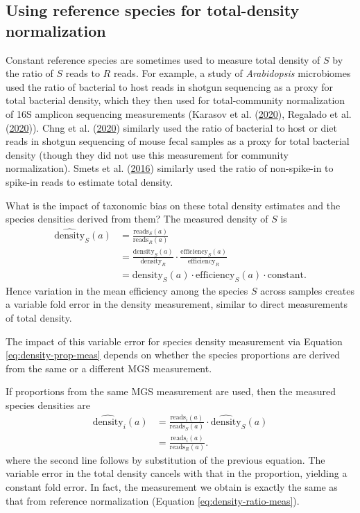 \documentclass[
]{article}
\begin{document}
\hypertarget{total-density-ref}{%
\subsection{Using reference species for total-density normalization}\label{total-density-ref}}

Constant reference species are sometimes used to measure total density of \(S\) by the ratio of \(S\) reads to \(R\) reads.
For example, a study of \emph{Arabidopsis} microbiomes used the ratio of bacterial to host reads in shotgun sequencing as a proxy for total bacterial density, which they then used for total-community normalization of 16S amplicon sequencing measurements (Karasov et al. (\protect\hyperlink{ref-karasov2020ther}{2020}), Regalado et al. (\protect\hyperlink{ref-regalado2019comb}{2020})).
Chng et al. (\protect\hyperlink{ref-chng2020meta}{2020}) similarly used the ratio of bacterial to host or diet reads in shotgun sequencing of mouse fecal samples as a proxy for total bacterial density (though they did not use this measurement for community normalization).
Smets et al. (\protect\hyperlink{ref-smets2016amet}{2016}) similarly used the ratio of non-spike-in to spike-in reads to estimate total density.

What is the impact of taxonomic bias on these total density estimates and the species densities derived from them?
The measured density of \(S\) is
\begin{align}
  \widehat{\text{density}}_{S}(a) 
  &= \frac{\text{reads}_S(a)}{\text{reads}_{R}(a)}
\\&= \frac{\text{density}_S(a)}{\text{density}_{R}} \cdot \frac{\text{efficiency}_S(a)}{\text{efficiency}_{R}}
\\&= \text{density}_S(a) \cdot \text{efficiency}_S(a) \cdot \text{constant}.
\end{align}
Hence variation in the mean efficiency among the species \(S\) across samples creates a variable fold error in the density measurement, similar to direct measurements of total density.

The impact of this variable error for species density measurement via Equation \eqref{eq:density-prop-meas} depends on whether the species proportions are derived from the same or a different MGS measurement.

If proportions from the same MGS measurement are used, then the measured species densities are
\begin{align}
  \widehat{\text{density}}_{i}(a) 
  &= \frac{\text{reads}_i(a)}{\text{reads}_{S}(a)} \cdot \widehat{\text{density}}_{S}(a)
\\&= \frac{\text{reads}_{i}(a)}{\text{reads}_{R}(a)}.
\end{align}
where the second line follows by substitution of the previous equation.
The variable error in the total density cancels with that in the proportion, yielding a constant fold error.
In fact, the measurement we obtain is exactly the same as that from reference normalization (Equation \eqref{eq:density-ratio-meas}).
\end{document}
